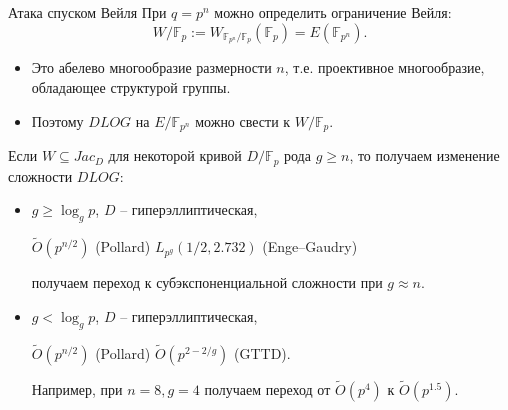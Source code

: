 \documentclass{beamer}
\begin{document}
\begin{frame}{Атака спуском Вейля}
	При $q = p^n$ можно определить ограничение Вейля:
	\[
	W/\mathbb{F}_p := W_{\mathbb{F}_{p^n} / \mathbb{F}_p}(\mathbb{F}_p) = E(\mathbb{F}_{p^n}).
	\]

    \begin{itemize}
        \item Это абелево многообразие размерности $n$, т.е. проективное многообразие, обладающее структурой группы.
        \item Поэтому $DLOG$ на $E/\mathbb{F}_{p^n}$ можно свести к $W/\mathbb{F}_p$.
    \end{itemize}
\end{frame}

\begin{frame}
Если $W \subseteq Jac_D$ для некоторой кривой $D/\mathbb{F}_p$ рода $g \geq n$, то получаем изменение сложности $DLOG$:
\begin{itemize}
    \item $g \geq \log_g{p}$, $D$ -- гиперэллиптическая,%
    \begin{center}
      $\widetilde{O}(p^{n/2})$ (Pollard) \structure{$\implies$} $L_{p^g}(1/2, 2.732)$ (Enge–Gaudry)
    \end{center}
    получаем переход к субэкспоненциальной сложности при $g \approx n$.
    \item $g < \log_g{p}$, $D$ -- гиперэллиптическая,
    \begin{center}
        $\widetilde{O}(p^{n/2})$ (Pollard) \structure{$\implies$} $\widetilde{O}(p^{2-2/g})$ (GTTD).
    \end{center}
    Например, при $n = 8, g = 4$ получаем переход от $\widetilde{O}(p^{4})$ к $\widetilde{O}(p^{1.5})$.
\end{itemize}
\end{frame}
\end{document}
